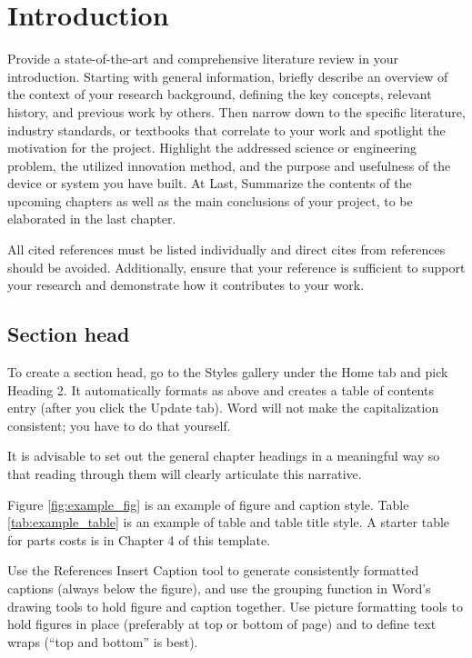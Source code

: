\clearpage
\section{Introduction}

Provide a state-of-the-art and comprehensive literature review in your introduction. Starting with general information, briefly describe an overview of the context of your research background, defining the key concepts, relevant history, and previous work by others. Then narrow down to the specific literature, industry standards, or textbooks that correlate to your work and spotlight the motivation for the project. Highlight the addressed science or engineering problem, the utilized innovation method, and the purpose and usefulness of the device or system you have built. At Last, Summarize the contents of the upcoming chapters as well as the main conclusions of your project, to be elaborated in the last chapter.

All cited references\cite{bibeg} must be listed individually and direct cites from references should be avoided.   Additionally, ensure that your reference is sufficient to support your research and demonstrate how it contributes to your work.

\subsection{Section head}

To create a section head, go to the Styles gallery under the Home tab and pick Heading 2. It automatically formats as above and creates a table of contents entry (after you click the Update tab). Word will not make the capitalization consistent; you have to do that yourself.

It is advisable to set out the general chapter headings in a meaningful way so that reading through them will clearly articulate this narrative. 

Figure \ref{fig:example_fig} is an example of figure and caption style. Table \ref{tab:example_table} is an example of table and table title style. A starter table for parts costs is in Chapter 4 of this template.

Use the References Insert Caption tool to generate consistently formatted captions (always below the figure), and use the grouping function in Word’s drawing tools to hold figure and caption together. Use picture formatting tools to hold figures in place (preferably at top or bottom of page) and to define text wraps (“top and bottom” is best).

